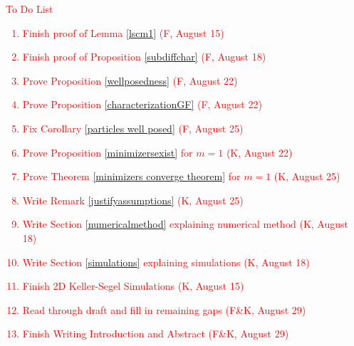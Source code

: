 \documentclass[11pt,leqno]{amsart}
\theoremstyle{definition}
\begin{document}
\begin{abstract}
\end{abstract}
\newpage
\textcolor{red}{To Do List
\begin{enumerate}
\item Finish proof of Lemma \ref{lscm1} (F, August 15)
\item Finish proof of Proposition \ref{subdiffchar} (F, August 18)
\item Prove Proposition \ref{wellposedness} (F, August 22)
\item Prove Proposition \ref{characterizationGF} (F, August 22)
\item Fix Corollary \ref{particles well posed} (F, August 25)
\item Prove Proposition \ref{minimizersexist} for $m=1$ (K, August 22)
\item Prove Theorem \ref{minimizers converge theorem} for $m=1$ (K, August 25)
\item Write Remark \ref{justifyassumptions} (K, August 25)
\item Write Section \ref{numericalmethod} explaining numerical method (K, August 18)
\item Write Section \ref{simulations} explaining simulations (K, August 18)
\item Finish 2D Keller-Segel Simulations (K, August 15)
\item Read through draft and fill in remaining gaps (F\&K, August 29)
\item Finish Writing Introduction and Abstract (F\&K, August 29)
\end{enumerate}}
\end{document}
